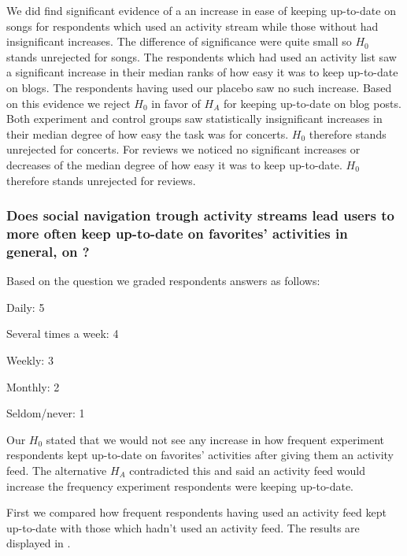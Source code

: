 \begin{items}
   We did find significant evidence
    of a an increase in ease of keeping up-to-date on songs for respondents
    which used an activity stream while those without had insignificant
    increases. The difference of significance were quite small so $H_0$
    stands unrejected for songs.
   The respondents which had used an activity list saw a
    significant increase in their median ranks of how easy it was
    to keep up-to-date on blogs. The respondents having used our placebo
    saw no such increase. Based on this evidence we reject $H_0$ in favor
    of $H_A$ for keeping up-to-date on blog posts.
   Both experiment and control groups saw
    statistically insignificant increases in their median degree of how easy
    the task was for concerts. $H_0$ therefore stands unrejected for concerts.
   For reviews we noticed no significant increases or decreases
    of the median degree of how easy it was to keep up-to-date. 
    $H_0$ therefore stands unrejected for reviews.
\end{items}

\subsubsection{%
  Does social navigation trough activity streams lead users to more often keep
  up-to-date on favorites' activities in general, on \urort{}?
}

Based on the question
we graded respondents answers as follows: 

\begin{items}
  \item Daily: 5
  \item Several times a week: 4
  \item Weekly: 3
  \item Monthly: 2
  \item Seldom/never: 1
\end{items}

Our $H_0$ stated that we would not see any increase in how frequent
experiment respondents kept up-to-date on favorites' activities after giving
them an activity feed. The alternative $H_A$ contradicted this and said
an activity feed would increase the frequency experiment respondents were
keeping up-to-date.

First we compared how frequent respondents having used an activity feed kept
up-to-date with those which hadn't used an activity feed. The results are
displayed in .

